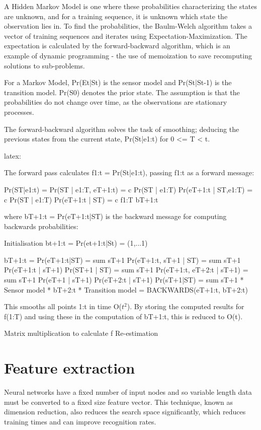 \documentclass[12pt,a4,notitlepage]{report}
\renewcommand{\_}{\texttt{\symbol{95}}}
\newcommand{\<}{\texttt{\symbol{60}}}
\renewcommand{\>}{\texttt{\symbol{62}}}
\begin{document}
A Hidden Markov Model is one where these probabilities characterizing the states are unknown, and for a training sequence, it is unknown which state the observation lies in. To find the probabilities, the Baulm-Welch algorithm takes a vector of training sequences and iterates using Expectation-Maximization. The expectation is calculated by the forward-backward algorithm, which is an example of dynamic programming - the use of memoization to save recomputing solutions to sub-problems.

For a Markov Model, Pr(Et|St) is the sensor model and Pr(St|St-1) is the transition model. Pr(S0) denotes the prior state. The assumption is that the probabilities do not change over time, as the observations are stationary processes.

The forward-backward algorithm solves the task of smoothing; deducing the previous states from the current state, Pr(St|e1:t) for 0 <= T < t. 

{latex:

The forward pass calculates f1:t = Pr(St|e1:t), passing f1:t as a forward message:

Pr(ST|e1:t) = Pr(ST | e1:T, eT+1:t)
			= c Pr(ST | e1:T) Pr(eT+1:t | ST,e1:T)
			= c Pr(ST | e1:T) Pr(eT+1:t | ST)
			= c f1:T bT+1:t

			
where bT+1:t = Pr(eT+1:t|ST) is the backward message for computing backwards probabilities:

Initialisation	 		bt+1:t = Pr(et+1:t|St) = (1,...1)

bT+1:t 	= Pr(eT+1:t|ST) = sum sT+1 Pr(eT+1:t, sT+1 | ST)
						= sum sT+1 Pr(eT+1:t | sT+1) Pr(ST+1 | ST)
						= sum sT+1 Pr(eT+1:t, eT+2:t | sT+1)
						= sum sT+1 Pr(eT+1 | sT+1) Pr(eT+2:t | sT+1) Pr(sT+1|ST)
						= sum sT+1 * Sensor model * bT+2:t * Transition model
						= BACKWARDS(eT+1:t, bT+2:t)
}

This smooths all points 1:t in time O($t^2$). By storing the computed results for f(1:T) and using these in the computation of bT+1:t, this is reduced to O(t).

Matrix multiplication to calculate f
Re-estimation

\section{Feature extraction}

Neural networks have a fixed number of input nodes and so variable length data must be converted to a fixed size feature vector. This technique, known as dimension reduction, also reduces the search space significantly, which reduces training times and can improve recognition rates.
\end{document}
